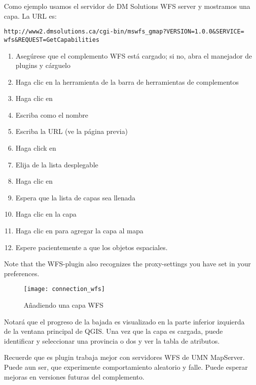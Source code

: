 Como ejemplo usamos el servidor de DM Solutions WFS server y mostramos una capa. La URL es:
\begin{verbatim}
http://www2.dmsolutions.ca/cgi-bin/mswfs_gmap?VERSION=1.0.0&SERVICE=
wfs&REQUEST=GetCapabilities
\end{verbatim}

\begin{enumerate}
  \item Asegúrese que el complemento WFS está cargado; si no, abra el manejador de plugins y cárguelo
  \item Haga clic en la herramienta 
  de la barra de herramientas de complementos
  \item Haga clic en   
  \item Escriba  como el nombre
  \item Escriba la URL (ve la página previa)
  \item Haga click en  
  \item Elija  de la lista desplegable
  \item Haga clic en  
  \item Espera que la lista de capas sea llenada
  \item Haga clic en la capa 
  \item Haga clic en  para agregar la capa al mapa
  \item Espere pacientemente a que los objetos espaciales.
\end{enumerate}

Note that the WFS-plugin also recognizes the proxy-settings you have set
in your preferences.

\begin{figure}[ht]
  \begin{center}
  	\caption{Añadiendo una capa WFS \nixcaption}\label{fig:wfs_dmsolutions}
	\texttt{[image: connection\_wfs]}
  \end{center}
\end{figure}

Notará que el progreso de la bajada  es visualizado en la parte inferior izquierda de la ventana principal de QGIS. 
Una vez que la capa es cargada, puede identificar y seleccionar una provincia o dos y ver la tabla de atributos.

Recuerde que es plugin trabaja mejor con servidores WFS de UMN MapServer. Puede aun ser, que experimente comportamiento aleatorio y falle. Puede esperar mejoras en versiones futuras del complemento.

